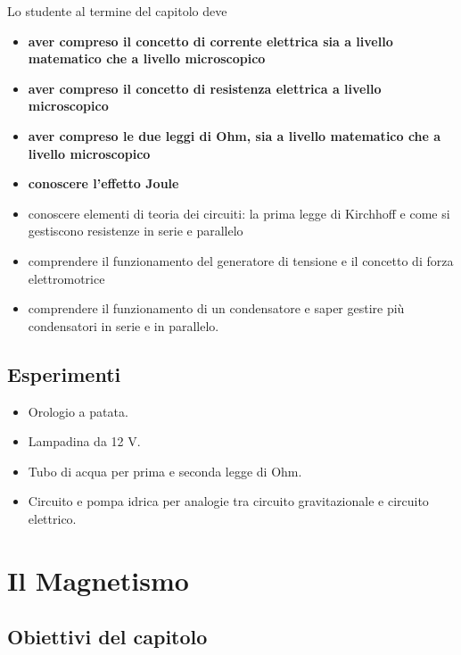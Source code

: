 \documentclass[11pt]{report}
\begin{document}
Lo studente al termine del capitolo deve
\begin{itemize}
    \item \textbf{aver compreso il concetto di corrente elettrica sia a livello matematico che a livello microscopico}
    \item \textbf{aver compreso il concetto di resistenza elettrica a livello microscopico}
    \item \textbf{aver compreso le due leggi di Ohm, sia a livello matematico che a livello microscopico}
    \item \textbf{conoscere l'effetto Joule}
    \item conoscere elementi di teoria dei circuiti: la prima legge di Kirchhoff e come si gestiscono resistenze in serie e parallelo
    \item comprendere il funzionamento del generatore di tensione e il concetto di forza elettromotrice
    \item comprendere il funzionamento di un condensatore e saper gestire più condensatori in serie e in parallelo.
\end{itemize}

\section*{Esperimenti}
\begin{itemize}
    \item Orologio a patata.
    \item Lampadina da 12 V.
    \item Tubo di acqua per prima e seconda legge di Ohm.
    \item Circuito e pompa idrica per analogie tra circuito gravitazionale e circuito elettrico.
\end{itemize}

\chapter{Il Magnetismo}

\section*{Obiettivi del capitolo}
\end{document}
